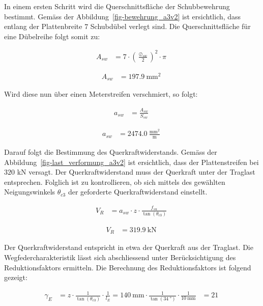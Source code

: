 \documentclass[
  11pt,
  letterpaper,
]{scrreprt}
\begin{document}
In einem ersten Schritt wird die Querschnittsfläche der Schubbewehrung
bestimmt. Gemäss der Abbildung~\ref{fig-bewehrung_a3v2} ist ersichtlich,
dass entlang der Plattenbreite \(7\) Schubdübel verlegt sind. Die
Querschnittsfläche für eine Dübelreihe folgt somit zu:

$$
\begin{aligned}
A_{sw} &= 7 \cdot \left( \frac{ \oslash_{sw} }{ 2 } \right) ^{ 2 } \cdot \pi \; 
\end{aligned}
$$

$$
\begin{aligned}
A_{sw} &= 197.9\ \mathrm{mm}^{2} \;
\end{aligned}
$$

Wird diese nun über einen Meterstreifen verschmiert, so folgt:

$$
\begin{aligned}
a_{sw} &= \frac{ A_{sw} }{ S_{sw} } \; 
\end{aligned}
$$

$$
\begin{aligned}
a_{sw} &= 2474.0\ \frac{\mathrm{mm}^{2}}{\mathrm{m}} \;
\end{aligned}
$$

Darauf folgt die Bestimmung des Querkraftwiderstands. Gemäss der
Abbildung~\ref{fig-last_verformung_a3v2} ist ersichtlich, dass der
Plattenstreifen bei \(320\) kN versagt. Der Querkraftwiderstand muss der
Querkraft unter der Traglast entsprechen. Folglich ist zu kontrollieren,
ob sich mittels des gewählten Neigungswinkels \(\theta_{c3}\) der
geforderte Querkraftwiderstand einstellt.

$$
\begin{aligned}
V_{R} &= a_{sw} \cdot z \cdot \frac{ f_{su} }{ \tan \left( \theta_{c3} \right) } \; 
\end{aligned}
$$

$$
\begin{aligned}
V_{R} &= 319.9\ \mathrm{kN} \;
\end{aligned}
$$

Der Querkraftwiderstand entspricht in etwa der Querkraft aus der
Traglast. Die Wegfedercharakteristik lässt sich abschliessend unter
Berücksichtigung des Reduktionsfaktors ermitteln. Die Berechnung des
Reduktionsfaktors ist folgend gezeigt:

$$
\begin{aligned}
\gamma_{E} &= z \cdot \frac{ 1 }{ \tan \left( \theta_{c3} \right) } \cdot \frac{1} { l_{E} }  = 140\ \mathrm{mm} \cdot \frac{ 1 }{ \tan \left( 34\ \mathrm{°} \right) } \cdot \frac{1} { 10\ \mathrm{mm} } &= 21\  
\end{aligned}
$$
\end{document}
